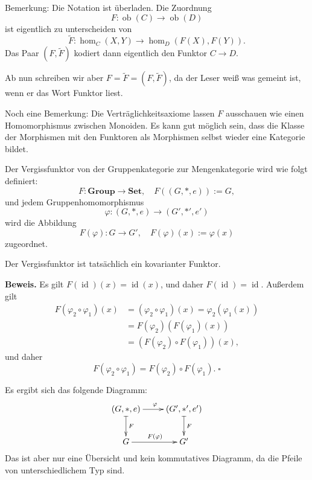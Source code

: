 \documentclass{beamer}
\newcommand{\id}{\operatorname{id}}
\newcommand{\ob}{\operatorname{ob}}
\newcommand{\strong}[1]{\textsf{\textbf{#1}}}
\renewcommand{\qedsymbol}{\ensuremath{\square}}
\begin{document}
\begin{frame}
Bemerkung: Die Notation ist überladen. Die Zuordnung
\[F\colon\ob(C)\to\ob(D)\]
ist eigentlich zu unterscheiden von
\[\tilde F\colon\hom_C(X,Y)\to\hom_D(F(X),F(Y)).\]
Das Paar $(F,\tilde F)$ kodiert dann eigentlich den Funktor $C\to D$.

\vspace{1em}
Ab nun schreiben wir aber $F=\tilde F=(F,\tilde F)$, da der Leser
weiß was gemeint ist, wenn er das Wort Funktor liest.
\end{frame}

\begin{frame}
Noch eine Bemerkung: Die Verträglichkeitsaxiome lassen $F$ ausschauen wie einen
Homomorphismus zwischen Monoiden. Es kann gut möglich
sein, dass die Klasse der Morphismen mit den Funktoren als
Morphismen selbst wieder eine Kategorie bildet.
\end{frame}


\begin{frame}
Der Vergissfunktor von der Gruppenkategorie zur Mengenkategorie wird
wie folgt definiert:
\[F\colon\mathbf{Group}\to\mathbf{Set},\quad F((G,*,e)):=G,\]
und jedem Gruppenhomomorphismus
\[\varphi\colon (G,*,e)\to (G',*',e')\]
wird die Abbildung
\[F(\varphi)\colon G\to G',\quad F(\varphi)(x):=\varphi(x)\]
zugeordnet.
\end{frame}

\begin{frame}
Der Vergissfunktor ist tatsächlich ein kovarianter Funktor.

\vspace{1em}
\strong{Beweis.}
Es gilt $F(\id)(x)=\id(x)$, und daher $F(\id)=\id$. Außerdem gilt
\begin{align*}
F(\varphi_2\circ\varphi_1)(x) &= (\varphi_2\circ\varphi_1)(x)
= \varphi_2(\varphi_1(x))\\
&= F(\varphi_2)(F(\varphi_1)(x))\\
&= (F(\varphi_2)\circ F(\varphi_1))(x),
\end{align*}
und daher
\[F(\varphi_2\circ\varphi_1) = F(\varphi_2)\circ F(\varphi_1).\;\qedsymbol\]
\end{frame}

\begin{frame}
Es ergibt sich das folgende Diagramm:
\[\xymatrix{(G,*,e) \ar[r]^\varphi \ar@{|->}[d]^F & \ar@{|->}[d]^F (G',*',e')\\
G \ar[r]^{F(\varphi)} & G'}
\]
Das ist aber nur eine Übersicht und kein kommutatives Diagramm, da
die Pfeile von unterschiedlichem Typ sind.
\end{frame}
\end{document}
